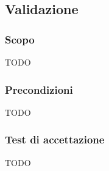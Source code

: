 \subsection{Validazione}\label{validazione}

\subsubsection{Scopo}
\par TODO

\subsubsection{Precondizioni}
\par TODO

\subsubsection{Test di accettazione}
\par TODO